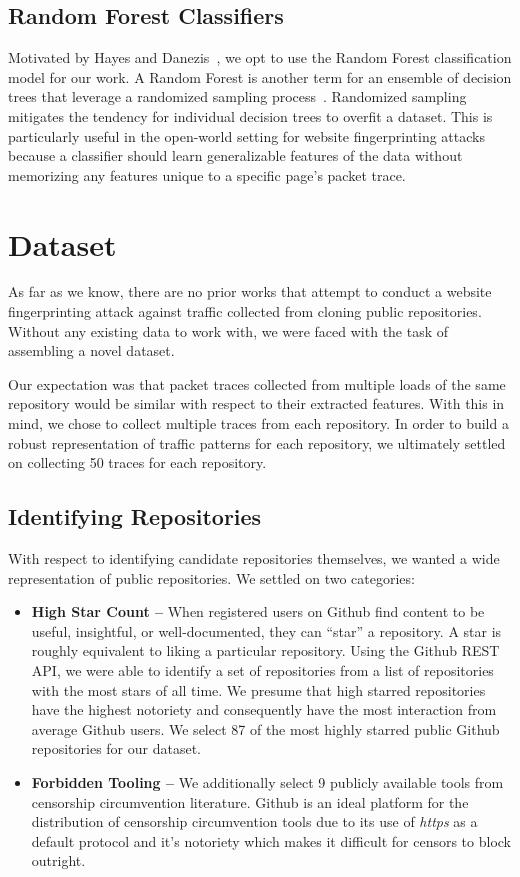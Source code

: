 \documentclass[sigconf,authorversion,nonacm]{acmart}
\begin{document}
\subsection{Random Forest Classifiers}
Motivated by Hayes and Danezis~\citep{hayes2016k}, we opt to use the Random Forest classification model for our work. A Random Forest is another term for an ensemble of decision trees that leverage a randomized sampling process~\citep{ho1995random}. Randomized sampling mitigates the tendency for individual decision trees to overfit a dataset. This is particularly useful in the open-world setting for website fingerprinting attacks because a classifier should learn generalizable features of the data without memorizing any features unique to a specific page's packet trace.

\section{Dataset}
As far as we know, there are no prior works that attempt to conduct a website fingerprinting attack against traffic collected from cloning public repositories. Without any existing data to work with, we were faced with the task of assembling a novel dataset.

Our expectation was that packet traces collected from multiple loads of the same repository would be similar with respect to their extracted features. With this in mind, we chose to collect multiple traces from each repository. In order to build a robust representation of traffic patterns for each repository, we ultimately settled on collecting 50 traces for each repository.

\subsection{Identifying Repositories}
With respect to identifying candidate repositories themselves, we wanted a wide representation of public repositories. We settled on two categories:
\begin{itemize}
  \item \textbf{High Star Count -- } When registered users on Github find content to be useful, insightful, or well-documented, they can ``star'' a repository. A star is roughly equivalent to liking a particular repository. Using the Github REST API, we were able to identify a set of repositories from a list of repositories with the most stars of all time. We presume that high starred repositories have the highest notoriety and consequently have the most interaction from average Github users. We select 87 of the most highly starred public Github repositories for our dataset.
  \item \textbf{Forbidden Tooling --} We additionally select 9 publicly available tools from censorship circumvention literature. Github is an ideal platform for the distribution of censorship circumvention tools due to its use of \textit{https} as a default protocol and it's notoriety which makes it difficult for censors to block outright.
\end{itemize}
\end{document}
